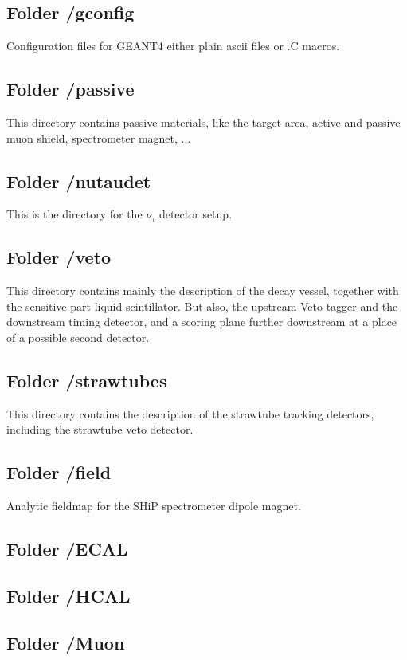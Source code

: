 \documentclass[12pt,a4paper]{article}
\begin{document}
\subsection{Folder /gconfig}
Configuration files for GEANT4 either plain ascii files or .C macros.

\subsection{Folder /passive}
This directory contains passive materials, like the target area, active and passive muon shield, spectrometer magnet, ...

\subsection{Folder /nutaudet}
This is the directory for the $\nu_\tau$ detector setup.

\subsection{Folder /veto}
This directory contains mainly the description of the decay vessel, together with the sensitive part liquid scintillator. But also, the 
upstream Veto tagger and the downstream timing detector, and a scoring plane further downstream at a place of a possible second detector.

\subsection{Folder /strawtubes}
This directory contains the description of the strawtube tracking detectors, including the  strawtube veto detector.

\subsection{Folder /field}
Analytic fieldmap for the SHiP spectrometer dipole magnet.

\subsection{Folder /ECAL}
\subsection{Folder /HCAL}
\subsection{Folder /Muon}
\end{document}
